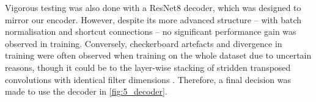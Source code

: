 Vigorous testing was also done with a ResNet8 decoder, which was designed to mirror our encoder. However, despite its more advanced structure -- with batch normalisation and shortcut connections -- no significant performance gain was observed in training. Conversely, checkerboard artefacts and divergence in training were often observed when training on the whole dataset due to uncertain reasons, though it could be to the layer-wise stacking of stridden transposed convolutions with identical filter dimensions \cite{odena2016deconvolution}. Therefore, a final decision was made to use the decoder in \cref{fig:5_decoder}.